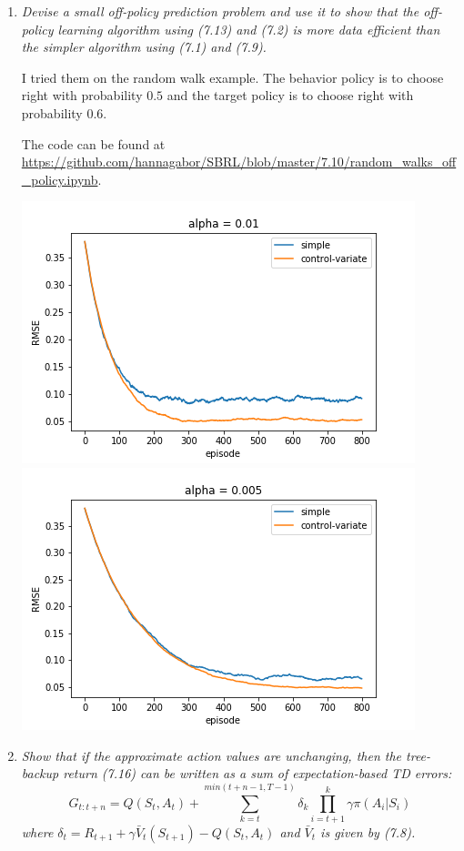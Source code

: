 \documentclass[12pt,a4paper]{article}
\begin{document}
\begin{enumerate}
  \item
    \textit{Devise a small off-policy prediction problem and use it to show that
    the off-policy learning algorithm using (7.13) and (7.2) is more data efficient
    than the simpler algorithm using (7.1) and (7.9).}

    I tried them on the random walk example. The behavior policy is to choose right
    with probability $0.5$ and the target policy is to choose right with probability
    $0.6$.

    The code can be found at \url{https://github.com/hannagabor/SBRL/blob/master/7.10/random_walks_off_policy.ipynb}.

    \begin{center}
    \includegraphics[scale=0.45]{off_0.01}
    \includegraphics[scale=0.45]{off_0.005}
    \end{center}

  \item
    \textit{Show that if the approximate action values are unchanging, then the
    tree-backup return (7.16) can be written as a sum of expectation-based TD errors:
    \[G_{t: t + n} = Q(S_t, A_t) + \sum\limits_{k = t}^{min(t + n - 1, T - 1)}
    \delta_k \prod\limits_{i = t + 1}^k \gamma \pi(A_i|S_i)\]
    where $\delta_t = R_{t + 1} + \gamma\bar{V}_t(S_{t + 1}) - Q(S_t, A_t)$ and
    $\bar{V}_t$ is given by (7.8).}


\end{enumerate}
\end{document}
